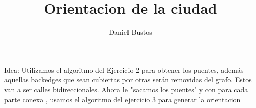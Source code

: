 \documentclass{article}
\title{Orientacion de la ciudad}
\author{Daniel Bustos}
\date{}
\begin{document}
\maketitle

Idea: Utilizamos el algoritmo del Ejercicio 2 para obtener los puentes, además aquellas backedges que sean cubiertas por otras serán removidas del grafo. Estos van a ser calles bidireccionales. Ahora le "sacamos los puentes" y con para cada parte conexa , usamos el algoritmo del ejercicio 3 para generar la orientacion
\end{document}
